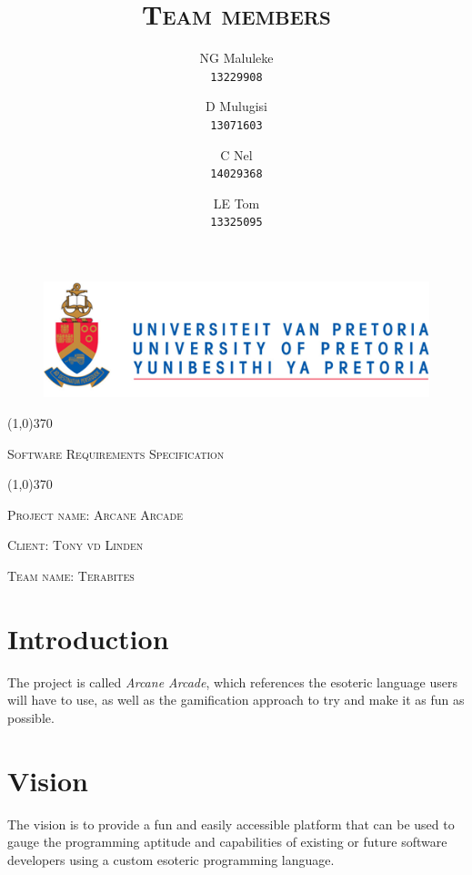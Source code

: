 \documentclass[english]{article}
\title{\scshape\Large Team members}
\author{
	NG Maluleke\\
	\texttt{13229908}
	\and
	D Mulugisi\\
	\texttt{13071603}
	\and
	C Nel\\
	\texttt{14029368}
	\and
	LE Tom\\
	\texttt{13325095}
}
\begin{document}
	
	\begin{figure}
		\includegraphics[width=\linewidth]{up_logo.png}
	\end{figure}
	
	\begin{center}
	 \line(1,0){370}
	\\[0.2cm]
    {\scshape\Large Software Requirements Specification \par}
	\vspace{0.1cm}
	\line(1,0){370}
	\\[0.8cm]
	
	{\scshape\large Project name: Arcane Arcade\par}	
	\vspace{1cm}
	{\scshape\large Client: Tony vd Linden\par}
	\vspace{1cm}
	{\scshape\large Team name: Terabites\par}
	\vspace{1cm}
	{\let\newpage\relax\maketitle}
	\end{center}
	
	
	\newpage
	\tableofcontents

	\newpage
	
	\section{Introduction}
		 The project is called \textit{Arcane Arcade}, which references the esoteric language users will have to use, as well as the gamification approach to try and make it as fun as possible.

	\section{Vision}
		The vision is to provide a fun and easily accessible platform that can be used to gauge the programming aptitude and capabilities of existing or future software developers using a custom esoteric programming language.
\end{document}
